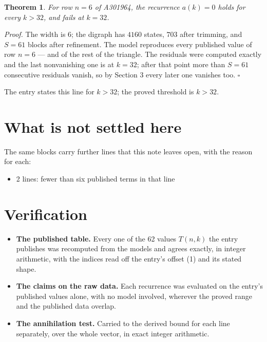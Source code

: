 \documentclass[11pt]{article}
\newtheorem{theorem}{Theorem}
\theoremstyle{definition}
\begin{document}
\begin{theorem} For row $n = 6$ of A301964, the recurrence $a(k) = 0$ holds for every $k > 32$, and fails at $k = 32$.\end{theorem}

{\itshape Proof.} The width is $6$; the digraph has $4160$ states, $703$ after trimming, and $S = 61$ blocks after refinement. The model reproduces every published value of row $n = 6$ --- and of the rest of the triangle. The residuals were computed exactly and the last nonvanishing one is at $k = 32$; after that point more than $S = 61$ consecutive residuals vanish, so by Section 3 every later one vanishes too. $\square$

The entry states this line for $k > 32$; the proved threshold is $k > 32$.

\section{What is not settled here}

The same blocks carry further lines that this note leaves open, with the reason for each:

\begin{itemize}

\item 2 lines: fewer than six published terms in that line

\end{itemize}

\section{Verification}

\begin{itemize}

\item {\bfseries The published table.} Every one of the 62 values $T(n,k)$ the entry publishes was recomputed from the models and agrees exactly, in integer arithmetic, with the indices read off the entry's offset (1) and its stated shape.

\item {\bfseries The claims on the raw data.} Each recurrence was evaluated on the entry's published values alone, with no model involved, wherever the proved range and the published data overlap.

\item {\bfseries The annihilation test.} Carried to the derived bound for each line separately, over the whole vector, in exact integer arithmetic.

\end{itemize}
\end{document}
